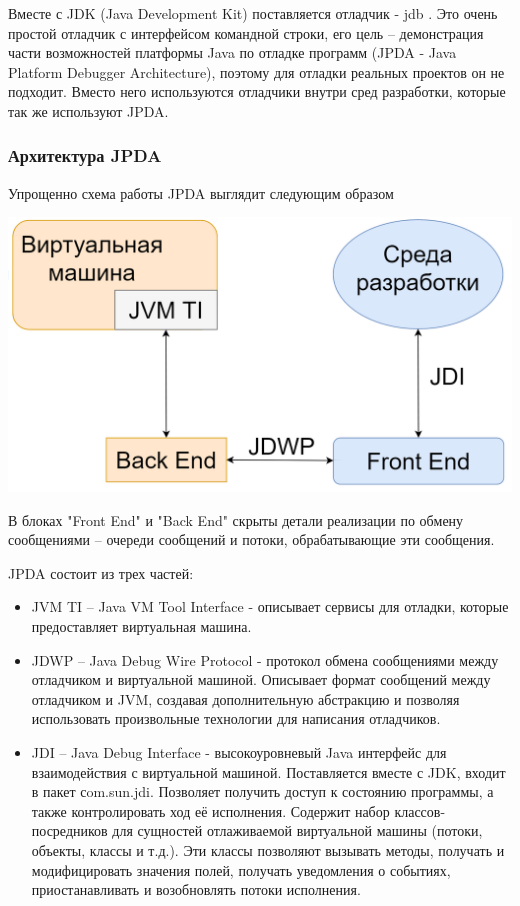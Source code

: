 Вместе с JDK (Java Development Kit) поставляется отладчик - jdb \cite{debug:jdb}. Это очень простой отладчик с интерфейсом командной строки, его цель -- демонстрация части возможностей платформы Java по отладке программ (JPDA - Java Platform Debugger Architecture), поэтому для отладки реальных проектов он не подходит. Вместо него используются отладчики внутри сред разработки, которые так же используют JPDA.

\subsubsection{Архитектура JPDA}\label{jdpa}
Упрощенно схема работы JPDA выглядит следующим образом

\vspace{1em}
\includegraphics[scale=0.4]{chapter1/img/jdpa.png}

В блоках "Front End" и "Back End" скрыты детали реализации по обмену сообщениями -- очереди сообщений и потоки, обрабатывающие эти сообщения.

JPDA состоит из трех частей:
\begin{itemize}
	\item JVM TI -- Java VM Tool Interface - описывает сервисы для отладки, которые предоставляет виртуальная машина.
	\item JDWP -- Java Debug Wire Protocol - протокол обмена сообщениями между отладчиком и виртуальной машиной. Описывает формат сообщений между отладчиком и JVM, создавая дополнительную абстракцию и позволяя использовать произвольные технологии для написания отладчиков.
	\item JDI -- Java Debug Interface - высокоуровневый Java интерфейс для взаимодействия с виртуальной машиной. Поставляется вместе с JDK, входит в пакет сom.sun.jdi. Позволяет получить доступ к состоянию программы, а также контролировать ход её исполнения. Содержит набор классов-посредников для сущностей отлаживаемой виртуальной машины (потоки, объекты, классы и т.д.). Эти классы позволяют вызывать методы, получать и модифицировать значения полей, получать уведомления о событиях, приостанавливать и возобновлять потоки исполнения.
\end{itemize}



